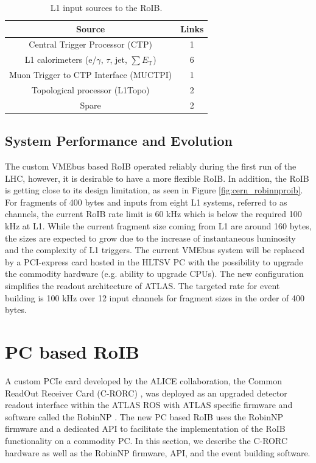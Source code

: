 \documentclass{JINST}
\begin{document}
\begin{table}[tbp]
\caption{L1 input sources to the RoIB.}
\label{tab:roib_links}
\smallskip
\centering
\begin{tabular}{|c|c|}
\hline
Source & Links\\
\hline
Central Trigger Processor (CTP)  & 1  \\
L1 calorimeters (e/$\gamma$, $\tau$, jet, $\sum E_\mathrm{T}$) & 6  \\
Muon Trigger to CTP Interface (MUCTPI) & 1  \\
Topological processor (L1Topo) & 2  \\
Spare & 2 \\
\hline
\end{tabular}
\end{table}

\subsection{System Performance and Evolution}\label{sec:roib_limit}

The custom VMEbus based RoIB operated reliably during the first run of the LHC, however, it is desirable to have a more flexible RoIB. 
In addition, the RoIB is getting close to its design limitation, as seen 
in Figure \ref{fig:cern_robinnproib}. For fragments of 400 bytes and inputs from eight L1 systems, referred to as channels, the current RoIB rate limit is 60 kHz which is below the required 100 kHz at 
L1. While the current fragment size coming from L1 are around 160 bytes, the sizes are expected to grow due to the increase of instantaneous 
luminosity and the complexity of L1 triggers. The current VMEbus system will be replaced by a PCI-express card hosted in the HLTSV PC with the 
possibility to upgrade the commodity hardware (e.g. ability to upgrade CPUs). 
The new configuration simplifies the readout architecture of ATLAS. The targeted rate for event building is 100 kHz over 12 input channels for 
fragment sizes in the order of 400 bytes.

\section{PC based RoIB}\label{sec:roib_new}

 A custom PCIe card developed by the ALICE collaboration, the Common ReadOut Receiver Card (C-RORC) \cite{alice}, was deployed as an 
upgraded detector readout interface within the ATLAS ROS with ATLAS specific firmware and software called the RobinNP \cite{crorc}. 
The new PC based RoIB uses the RobinNP firmware and a dedicated API to facilitate the implementation of the RoIB functionality 
on a commodity PC. In this section, we describe the C-RORC hardware as well as the RobinNP firmware, API, and the event building software. 
\end{document}
